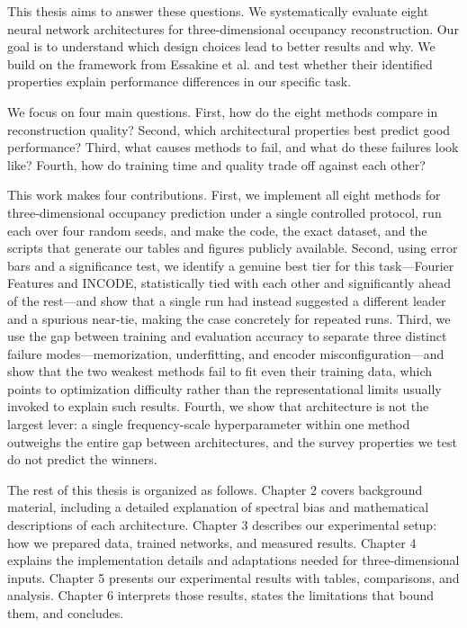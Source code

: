 This thesis aims to answer these questions. We systematically evaluate eight neural network architectures for three-dimensional occupancy reconstruction. Our goal is to understand which design choices lead to better results and why. We build on the framework from Essakine et al. and test whether their identified properties explain performance differences in our specific task.

We focus on four main questions. First, how do the eight methods compare in reconstruction quality? Second, which architectural properties best predict good performance? Third, what causes methods to fail, and what do these failures look like? Fourth, how do training time and quality trade off against each other?

This work makes four contributions. First, we implement all eight methods for three-dimensional occupancy prediction under a single controlled protocol, run each over four random seeds, and make the code, the exact dataset, and the scripts that generate our tables and figures publicly available. Second, using error bars and a significance test, we identify a genuine best tier for this task---Fourier Features and INCODE, statistically tied with each other and significantly ahead of the rest---and show that a single run had instead suggested a different leader and a spurious near-tie, making the case concretely for repeated runs. Third, we use the gap between training and evaluation accuracy to separate three distinct failure modes---memorization, underfitting, and encoder misconfiguration---and show that the two weakest methods fail to fit even their training data, which points to optimization difficulty rather than the representational limits usually invoked to explain such results. Fourth, we show that architecture is not the largest lever: a single frequency-scale hyperparameter within one method outweighs the entire gap between architectures, and the survey properties we test do not predict the winners.

The rest of this thesis is organized as follows. Chapter 2 covers background material, including a detailed explanation of spectral bias and mathematical descriptions of each architecture. Chapter 3 describes our experimental setup: how we prepared data, trained networks, and measured results. Chapter 4 explains the implementation details and adaptations needed for three-dimensional inputs. Chapter 5 presents our experimental results with tables, comparisons, and analysis. Chapter 6 interprets those results, states the limitations that bound them, and concludes.
